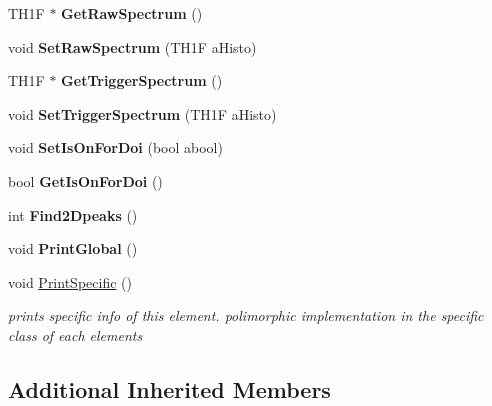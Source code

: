 \begin{DoxyCompactItemize}
\item 
\hypertarget{classMppc_aeeed71effe5210a9fe5ea4086dd99c6d}{T\+H1\+F $\ast$ {\bfseries Get\+Raw\+Spectrum} ()}\label{classMppc_aeeed71effe5210a9fe5ea4086dd99c6d}

\item 
\hypertarget{classMppc_a05ae0e638488d7ca7a2a7e8c223c7672}{void {\bfseries Set\+Raw\+Spectrum} (T\+H1\+F a\+Histo)}\label{classMppc_a05ae0e638488d7ca7a2a7e8c223c7672}

\item 
\hypertarget{classMppc_a829b437d3969c69f64b36f5ef5622017}{T\+H1\+F $\ast$ {\bfseries Get\+Trigger\+Spectrum} ()}\label{classMppc_a829b437d3969c69f64b36f5ef5622017}

\item 
\hypertarget{classMppc_acf55cba4b46c96dc4d80a9bbf565fe5b}{void {\bfseries Set\+Trigger\+Spectrum} (T\+H1\+F a\+Histo)}\label{classMppc_acf55cba4b46c96dc4d80a9bbf565fe5b}

\item 
\hypertarget{classMppc_a8796833b3eed967559c06608fa9c4bd2}{void {\bfseries Set\+Is\+On\+For\+Doi} (bool abool)}\label{classMppc_a8796833b3eed967559c06608fa9c4bd2}

\item 
\hypertarget{classMppc_a9cfa11f6573aba4e60b46486a4432825}{bool {\bfseries Get\+Is\+On\+For\+Doi} ()}\label{classMppc_a9cfa11f6573aba4e60b46486a4432825}

\item 
\hypertarget{classMppc_ac328d7b2056d789d6fc5d2d7fad40a46}{int {\bfseries Find2\+Dpeaks} ()}\label{classMppc_ac328d7b2056d789d6fc5d2d7fad40a46}

\item 
\hypertarget{classMppc_ac9ee63497a9c7d0fce0c8a03f6f337dd}{void {\bfseries Print\+Global} ()}\label{classMppc_ac9ee63497a9c7d0fce0c8a03f6f337dd}

\item 
void \hyperlink{classMppc_aab23e14995583c428c4cce1879936601}{Print\+Specific} ()
\begin{DoxyCompactList}\small\item\em prints specific info of this element. polimorphic implementation in the specific class of each elements \end{DoxyCompactList}\end{DoxyCompactItemize}
\subsection*{Additional Inherited Members}


